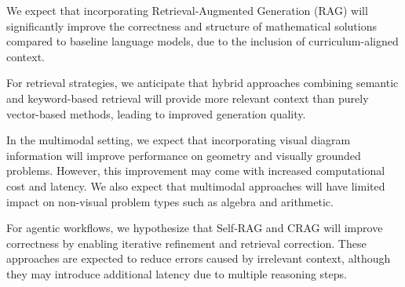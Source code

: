 \documentclass[11pt]{article}
\begin{document}
We expect that incorporating Retrieval-Augmented Generation (RAG) will significantly improve the correctness and structure of mathematical solutions compared to baseline language models, due to the inclusion of curriculum-aligned context.

For retrieval strategies, we anticipate that hybrid approaches combining semantic and keyword-based retrieval will provide more relevant context than purely vector-based methods, leading to improved generation quality.

In the multimodal setting, we expect that incorporating visual diagram information will improve performance on geometry and visually grounded problems. However, this improvement may come with increased computational cost and latency. We also expect that multimodal approaches will have limited impact on non-visual problem types such as algebra and arithmetic.

For agentic workflows, we hypothesize that Self-RAG and CRAG will improve correctness by enabling iterative refinement and retrieval correction. These approaches are expected to reduce errors caused by irrelevant context, although they may introduce additional latency due to multiple reasoning steps.
\end{document}
